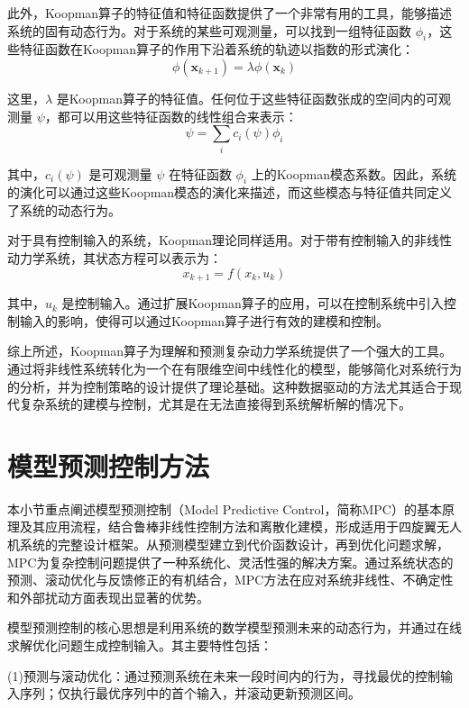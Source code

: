 \documentclass[lang=chs, degree=master, blindreview=false, winfonts=true]{yanputhesis}
\begin{document}
此外，Koopman算子的特征值和特征函数提供了一个非常有用的工具，能够描述系统的固有动态行为。对于系统的某些可观测量，可以找到一组特征函数 \( \phi_i \)，这些特征函数在Koopman算子的作用下沿着系统的轨迹以指数的形式演化：
\begin{equation}
    \phi(\bm x_{k+1}) = \lambda \phi(\bm x_k)
\end{equation}

这里，\( \lambda \) 是Koopman算子的特征值。任何位于这些特征函数张成的空间内的可观测量 \( \psi \)，都可以用这些特征函数的线性组合来表示：
\begin{equation}
    \psi = \sum_i c_i(\psi) \phi_i
\end{equation}

其中，\( c_i(\psi) \) 是可观测量 \( \psi \) 在特征函数 \( \phi_i \) 上的Koopman模态系数。因此，系统的演化可以通过这些Koopman模态的演化来描述，而这些模态与特征值共同定义了系统的动态行为。

对于具有控制输入的系统，Koopman理论同样适用。对于带有控制输入的非线性动力学系统，其状态方程可以表示为：
\begin{equation}
    x_{k+1} = f(x_k, u_k)
\end{equation}

其中，\( u_k \) 是控制输入。通过扩展Koopman算子的应用，可以在控制系统中引入控制输入的影响，使得可以通过Koopman算子进行有效的建模和控制。

综上所述，Koopman算子为理解和预测复杂动力学系统提供了一个强大的工具。通过将非线性系统转化为一个在有限维空间中线性化的模型，能够简化对系统行为的分析，并为控制策略的设计提供了理论基础。这种数据驱动的方法尤其适合于现代复杂系统的建模与控制，尤其是在无法直接得到系统解析解的情况下。


\section{模型预测控制方法}

本小节重点阐述模型预测控制（Model Predictive Control，简称MPC）的基本原理及其应用流程，结合鲁棒非线性控制方法和离散化建模，形成适用于四旋翼无人机系统的完整设计框架。从预测模型建立到代价函数设计，再到优化问题求解，MPC为复杂控制问题提供了一种系统化、灵活性强的解决方案。通过系统状态的预测、滚动优化与反馈修正的有机结合，MPC方法在应对系统非线性、不确定性和外部扰动方面表现出显著的优势。


模型预测控制的核心思想是利用系统的数学模型预测未来的动态行为，并通过在线求解优化问题生成控制输入。其主要特性包括：

(1)预测与滚动优化：通过预测系统在未来一段时间内的行为，寻找最优的控制输入序列；仅执行最优序列中的首个输入，并滚动更新预测区间。
\end{document}
